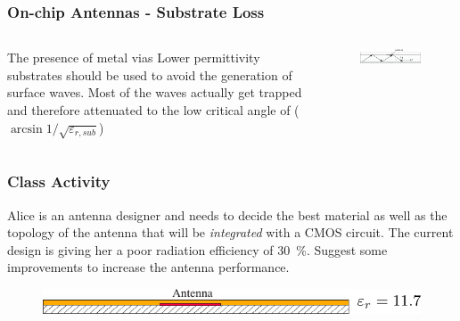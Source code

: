 \documentclass[10pt]{beamer}
\newcommand{\E}{\varepsilon}  %
\begin{document}
\begin{frame}
    \frametitle{On-chip Antennas - Substrate Loss}
    \begin{columns}
        \begin{column}{.5\textwidth}
            \begin{outline}
                \1 The presence of metal vias
                \1 Lower permittivity substrates should be used to avoid the generation of surface waves.
                \1 Most of the waves actually get trapped and therefore attenuated to the low critical angle of  ($\arcsin 1/\sqrt{\E_{r,sub}}$)
            \end{outline}
        \end{column}
        \begin{column}{.5\textwidth}
            \begin{figure}[]
                \centering
                \includegraphics[width=1\textwidth]{surface_waves_onchipantennas.pdf}
                \label{fig:meta_vias}
            \end{figure}
        \end{column}
    \end{columns}
\end{frame}

\begin{frame}
    \frametitle{Class Activity}

    Alice is an antenna designer and needs to decide the best material as well as the topology of the antenna that will be \textit{integrated} with a CMOS circuit. The current design is giving her a poor radiation efficiency of \SI{30}{\percent}. Suggest some improvements to increase the antenna performance.
    
    \begin{figure}[h!]
        \centering
        \includegraphics[width=.75\textwidth]{exercise.pdf}
    \end{figure}
\end{frame}
\end{document}
